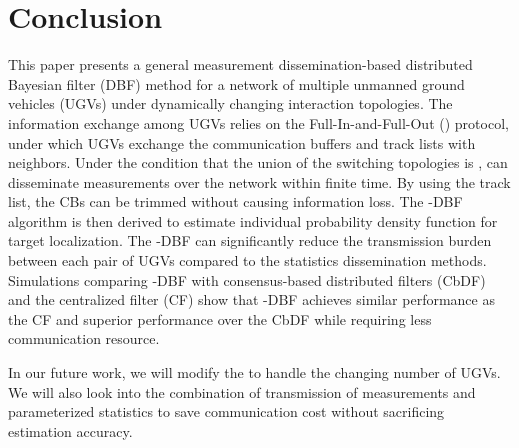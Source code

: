 \section{Conclusion}\label{sec:conclu}	
	This paper presents a general measurement dissemination-based distributed Bayesian filter (DBF) method for a network of multiple unmanned ground vehicles (UGVs) under dynamically changing interaction topologies.
	The information exchange among UGVs relies on the Full-In-and-Full-Out (\proto) protocol, under which UGVs exchange the communication buffers and track lists with neighbors.
	Under the condition that the union of the switching topologies is \fc, {\proto} can disseminate measurements over the network within finite time. 
	By using the track list, the CBs can be trimmed without causing information loss.
	The \proto-DBF algorithm is then derived to estimate individual probability density function for target localization. 	
	The \proto-DBF can significantly reduce the transmission burden between each pair of UGVs compared to the statistics dissemination methods. %
	Simulations comparing \proto-DBF with consensus-based distributed filters (CbDF) and the centralized filter (CF) show that \proto-DBF achieves similar performance as the CF and superior performance over the CbDF while requiring less communication resource.
	
	In our future work, we will modify the {\proto} to handle the changing number of UGVs. 
	We will also look into the combination of transmission of measurements and parameterized statistics to save communication cost without sacrificing estimation accuracy.